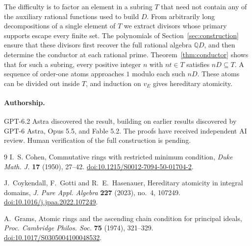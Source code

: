\documentclass[11pt, letterpaper]{article}
\theoremstyle{definition}
\theoremstyle{remark}
\begin{document}
The difficulty is to factor an element in a subring $T$ that need not contain any of the auxiliary rational functions used to build $D$.
From arbitrarily long decompositions of a single element of $T$ we extract divisors whose primary supports escape every finite set.
The polynomials of Section~\ref{sec:construction} ensure that these divisors first recover the full rational algebra $\mathbb{Q}D$, and then determine the conductor at each rational prime.
Theorem~\ref{thm:conductor} shows that for such a subring, every positive integer $n$ with $nt \in T$ satisfies $nD \subseteq T$.
A sequence of order-one atoms approaches $1$ modulo each such $nD$.
These atoms can be divided out inside $T$, and induction on $v_E$ gives hereditary atomicity.









\begin{samepage}
    \paragraph{Authorship.}
    GPT-6.2 Astra discovered the result, building on earlier results discovered by GPT-6 Astra, Opus 5.5, and Fable 5.2.
    The proofs have received independent AI review.
    Human verification of the full construction is pending.
    \par
\end{samepage}

\begin{thebibliography}{9}
    I.~S. Cohen, Commutative rings with restricted minimum condition,
    \emph{Duke Math. J.} \textbf{17} (1950), 27--42.
    \href{https://doi.org/10.1215/S0012-7094-50-01704-2}{doi:10.1215/S0012-7094-50-01704-2}.

    J.~Coykendall, F.~Gotti and R.~E.~Hasenauer, Hereditary atomicity in integral domains,
    \emph{J. Pure Appl. Algebra} \textbf{227} (2023), no.~4, 107249.
    \href{https://doi.org/10.1016/j.jpaa.2022.107249}{doi:10.1016/j.jpaa.2022.107249}.

    A.~Grams, Atomic rings and the ascending chain condition for principal ideals,
    \emph{Proc. Cambridge Philos. Soc.} \textbf{75} (1974), 321--329.
    \href{https://doi.org/10.1017/S0305004100048532}{doi:10.1017/S0305004100048532}.
\end{thebibliography}
\end{document}

